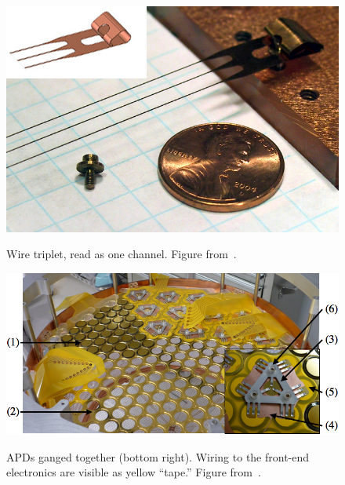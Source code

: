 \begin{figure}
\begin{center}
\includegraphics[keepaspectratio=true,width=\textwidth]{triplet.jpg}
\end{center}
\renewcommand{\baselinestretch}{1}
\small\normalsize
\begin{quote}
\caption{Wire triplet, read as one channel.  Figure from~\cite{detectorPartI}.}
\label{fig:WireTriplet}
\end{quote}
\end{figure}
\renewcommand{\baselinestretch}{2}
\small\normalsize

\begin{figure}
\begin{center}
\includegraphics[keepaspectratio=true,width=\textwidth]{PlatterWGO7.png}
\end{center}
\renewcommand{\baselinestretch}{1}
\small\normalsize
\begin{quote}
\caption{APDs ganged together (bottom right).  Wiring to the front-end electronics are visible as yellow ``tape.''  Figure from~\cite{detectorPartI}.}
\label{fig:APDgang}
\end{quote}
\end{figure}
\renewcommand{\baselinestretch}{2}
\small\normalsize

